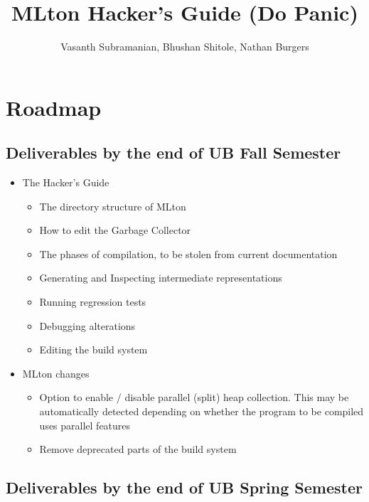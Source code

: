 \documentclass{article}
\title{MLton Hacker's Guide (Do Panic)}
\author{Vasanth Subramanian, Bhushan Shitole, Nathan Burgers}
\date{}
\begin{document}
\maketitle
\tableofcontents
\clearpage

\section{Roadmap}
\subsection{Deliverables by the end of UB Fall Semester}
\begin{itemize}
\item The Hacker's Guide
  \begin{itemize}
  \item The directory structure of MLton
  \item How to edit the Garbage Collector
  \item The phases of compilation, to be stolen from current documentation
  \item Generating and Inspecting intermediate representations
  \item Running regression tests
  \item Debugging alterations
  \item Editing the build system
  \end{itemize}
\item MLton changes
  \begin{itemize}
  \item Option to enable / disable parallel (split) heap collection. This may be automatically detected depending on whether the program to be compiled uses parallel features
  \item Remove deprecated parts of the build system
  \end{itemize}
\end{itemize}
\subsection{Deliverables by the end of UB Spring Semester}
\begin{itemize}
  
\end{itemize}
\end{document}
